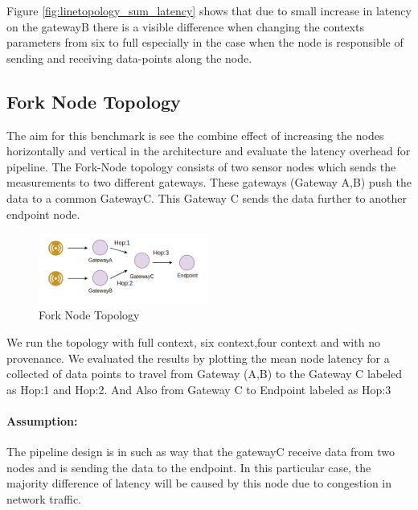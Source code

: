 Figure \ref{fig:linetopology_sum_latency} shows that due to small increase in latency on the gatewayB there is a visible difference when changing the contexts parameters from six to full especially in the case when the node is responsible of sending and receiving data-points along the node.


\subsection{Fork Node Topology}
The aim for this benchmark is see the combine effect of increasing the nodes horizontally and vertical in the architecture and evaluate the latency overhead for pipeline. The Fork-Node topology consists of two sensor nodes which sends the measurements to two different gateways. These gateways (Gateway A,B) push the data to a common GatewayC. This Gateway C sends the data further to another endpoint node.

\begin{figure}[H]
	\center
	\includegraphics[width=0.5\textwidth]{figures/latencytopo_fork.png}
	\caption{Fork Node Topology}
	\label{fig:fork_topo}
\end{figure}

We run the topology with full context, six context,four context and with no provenance. We evaluated the results by plotting the mean node latency for a collected of data points
to travel from Gateway (A,B) to the Gateway C labeled as Hop:1  and Hop:2. And Also from Gateway C to Endpoint labeled as Hop:3

\paragraph*{Assumption:}
The pipeline design is in such as way that the gatewayC receive data from two nodes and is sending the data to the endpoint. In this particular case, the majority difference of latency will be caused by this node due to congestion in network traffic.

